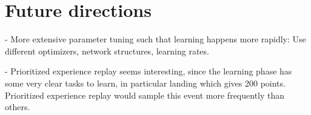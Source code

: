 \documentclass{article}
\begin{document}
\section{Future directions}
- More extensive parameter tuning such that learning happens more rapidly: Use different optimizers, network structures, learning rates.

- Prioritized experience replay seems interesting, since the learning phase has some very clear tasks to learn, in particular landing which gives 200 points. Prioritized experience replay would sample this event more frequently than others.






\end{document}

